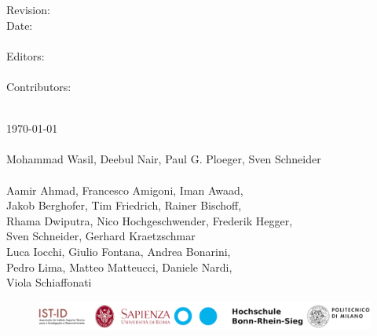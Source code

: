 \vfill
\noindent
\begin{minipage}[t]{0.18\textwidth}
\flushleft
	Revision:\\
	Date:\\
	\mbox{~}\\
	Editors:\\
	\mbox{~}\\
	Contributors:\\
\end{minipage}%
\hspace*{3mm}
\begin{minipage}[t]{0.8\textwidth}
\flushleft
	\revisionNumberRuleBook\\
	\today\\
	\mbox{~}\\
	Mohammad Wasil, Deebul Nair, Paul G. Ploeger, Sven Schneider\\
	\mbox{~}\\
	Aamir Ahmad, Francesco Amigoni, Iman Awaad,\\ 
	Jakob Berghofer, Tim Friedrich, Rainer Bischoff,\\
	Rhama Dwiputra, Nico Hochgeschwender, Frederik Hegger,\\
	Sven Schneider, Gerhard Kraetzschmar \\
	Luca Iocchi, Giulio Fontana, Andrea Bonarini,\\
	Pedro Lima,	Matteo Matteucci, Daniele Nardi, \\
	Viola Schiaffonati
\end{minipage}
\hfill

\vfill
\vspace*{-10mm}
\begin{figure}[b]
	\centering
	\includegraphics[height=\institutionLogoHeight*2/5]{./fig/logos/ERL-CSR_logos.pdf}
\end{figure}

